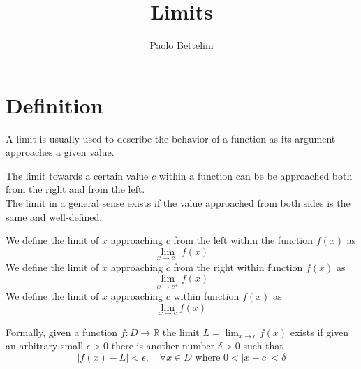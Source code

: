 \documentclass{article}
\title{Limits}
\author{Paolo Bettelini}
\date{}
\begin{document}
\maketitle
\tableofcontents
\pagebreak

\section{Definition}

A limit is usually used to describe the behavior of a function as its argument approaches a given value.

The limit towards a certain value \(c\) within a function can be be approached both from the right and from the left. \\
The limit in a general sense exists if the value approached from both sides is the same and well-defined.

We define the limit of \(x\) approaching \(c\) from the left within the function \(f(x)\) as
\[
    \lim_{x\to c^{-}}f(x)
\]
We define the limit of \(x\) approaching \(c\) from the right within function \(f(x)\) as
\[
    \lim_{x\to c^{+}}f(x)
\]
We define the limit of \(x\) approaching \(c\) within function \(f(x)\) as
\[
    \lim_{x\to c}f(x)
\]

Formally, given a function \(f:D\to \mathbb{R}\) the limit \(L=\lim_{x\to c}f(x)\) exists if given an arbitrary small \(\epsilon >0\) there is another number \(\delta >0\) such that
\[
    |f(x)-L|<\epsilon,\quad
    \forall x\in D \text{ where } 0<|x-c|<\delta
\]

\pagebreak
\end{document}
